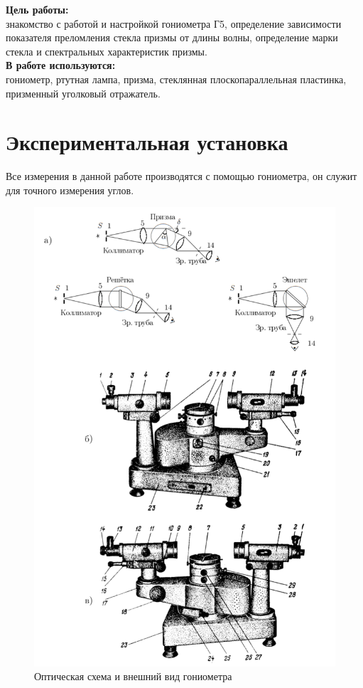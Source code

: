


	
	
	\noindent \textbf{Цель работы:}\\
	\indent знакомство с работой и настройкой гониометра Г5, определение зависимости показателя преломления стекла призмы от длины волны, определение марки стекла и спектральных характеристик призмы.\\
	\noindent \textbf{В работе используются:}\\
	\indent гониометр, ртутная лампа, призма, стеклянная плоскопараллельная пластинка, призменный уголковый отражатель.
	
	\section*{Экспериментальная установка}
	
	Все измерения в данной работе производятся с помощью гониометра, он служит для точного измерения углов.
	
	\begin{figure}[h!]
		\centering
		\includegraphics[scale=1]{images/scheme_1.png}
		\caption{Оптическая схема и внешний вид гониометра}
		\label{fig:scheme_1}
	\end{figure}
	
